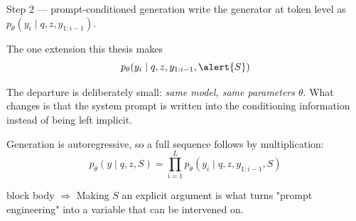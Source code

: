 \documentclass[11pt,aspectratio=169]{beamer}
\newcommand{\takeaway}[1]{%
  \vfill
  \begin{beamercolorbox}[wd=\textwidth,sep=5pt,rounded=true]{block body}%
    \small\textbf{$\Rightarrow$} #1
  \end{beamercolorbox}}
\begin{document}
\begin{frame}{Step 2 --- prompt-conditioned generation}
  \citet{lewis2020rag} write the generator at token level as
  $p_\theta(y_i \mid q,z,y_{1:i-1})$.
  \medskip

  \begin{block}{The one extension this thesis makes}
    \vspace{-0.8em}
    \begin{equation*}
      p_\theta(y_i \mid q,z,y_{1:i-1},\alert{S})
    \end{equation*}
  \end{block}
  \medskip

  The departure is deliberately small: \emph{same model, same parameters
  $\theta$}. What changes is that the system prompt is written into the
  conditioning information instead of being left implicit.
  \medskip

  Generation is autoregressive, so a full sequence follows by multiplication:
  \begin{equation*}
    p_\theta(y \mid q,z,S) = \prod_{i=1}^{L} p_\theta(y_i \mid q,z,y_{1:i-1},S)
  \end{equation*}
  \takeaway{Making $S$ an explicit argument is what turns "prompt
  engineering" into a variable that can be intervened on.}
\end{frame}
\end{document}
